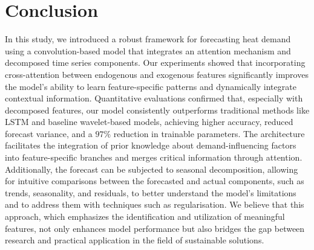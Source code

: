 \section{Conclusion}

In this study, we introduced a robust framework for forecasting heat demand using a convolution-based model that integrates an attention mechanism and decomposed time series components. 
Our experiments showed that incorporating cross-attention between endogenous and exogenous features significantly improves the model's ability to learn feature-specific patterns and dynamically integrate contextual information. Quantitative evaluations confirmed that, especially with decomposed features, our model consistently outperforms traditional methods like LSTM and baseline wavelet-based models, achieving higher accuracy, reduced forecast variance, and a $97\%$ reduction in trainable parameters.
The architecture facilitates the integration of prior knowledge about demand-influencing factors into feature-specific branches and merges critical information through attention. Additionally, the forecast can be subjected to seasonal decomposition, allowing for intuitive comparisons between the forecasted and actual components, such as trends, seasonality, and residuals, to better understand the model's limitations and to address them with techniques such as regularisation. We believe that this approach, which emphasizes the identification and utilization of meaningful features, not only enhances model performance but also bridges the gap between research and practical application in the field of sustainable solutions.

